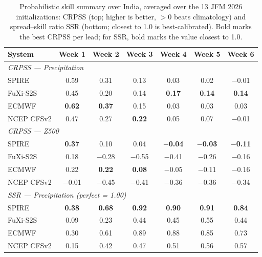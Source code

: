 \documentclass[11pt]{article}
\begin{document}
\begin{table}[t]
  \centering
  \small
  \setlength{\tabcolsep}{5pt}
  \caption{Probabilistic skill summary over India, averaged over the 13
  JFM 2026 initializations: CRPSS (top; higher is better, ${>}0$ beats
  climatology) and spread--skill ratio SSR (bottom; closest to 1.0 is
  best-calibrated). Bold marks the best CRPSS per lead; for SSR, bold
  marks the value closest to 1.0.}
  \label{tab:prob}
  \begin{tabular}{lcccccc}
    \toprule
    System & Week 1 & Week 2 & Week 3 & Week 4 & Week 5 & Week 6 \\
    \midrule
    \multicolumn{7}{l}{\emph{CRPSS --- Precipitation}}\\
    SPIRE      & 0.59          & 0.31 & 0.13          & 0.03          & 0.02          & $-$0.01 \\
    FuXi-S2S   & 0.45          & 0.20 & 0.14          & \textbf{0.17} & \textbf{0.14} & \textbf{0.14} \\
    ECMWF      & \textbf{0.62} & \textbf{0.37} & 0.15     & 0.03          & 0.03          & 0.03 \\
    NCEP CFSv2 & 0.47          & 0.27 & \textbf{0.22} & 0.05          & 0.07          & $-$0.01 \\
    \midrule
    \multicolumn{7}{l}{\emph{CRPSS --- Z500}}\\
    SPIRE      & \textbf{0.37} & 0.10    & 0.04          & \textbf{$-$0.04} & \textbf{$-$0.03} & \textbf{$-$0.11} \\
    FuXi-S2S   & 0.18          & $-$0.28 & $-$0.55       & $-$0.41          & $-$0.26          & $-$0.16 \\
    ECMWF      & 0.22          & \textbf{0.22} & \textbf{0.08} & $-$0.05       & $-$0.11          & $-$0.16 \\
    NCEP CFSv2 & $-$0.01       & $-$0.45 & $-$0.41       & $-$0.36          & $-$0.36          & $-$0.34 \\
    \midrule
    \multicolumn{7}{l}{\emph{SSR --- Precipitation (perfect = 1.00)}}\\
    SPIRE      & \textbf{0.38} & \textbf{0.68} & \textbf{0.92} & \textbf{0.90} & \textbf{0.91} & \textbf{0.84} \\
    FuXi-S2S   & 0.09          & 0.23          & 0.44          & 0.45          & 0.55          & 0.44 \\
    ECMWF      & 0.30          & 0.61          & 0.89          & 0.88          & 0.85          & 0.73 \\
    NCEP CFSv2 & 0.15          & 0.42          & 0.47          & 0.51          & 0.56          & 0.57 \\

\end{tabular}
\end{table}
\end{document}
